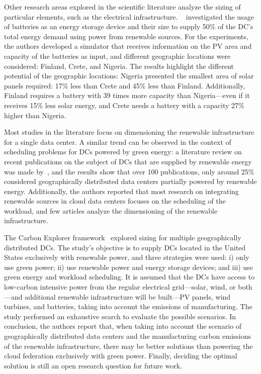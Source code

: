 Other research areas explored in the scientific literature analyze the sizing of particular elements, such as the electrical infrastructure. ~\citet{sheme2018_batsize} investigated the usage of batteries as an energy storage device and their size to supply 50\% of the DC's total energy demand using power from renewable sources. For the experiments, the authors developed a simulator that receives information on the PV area and capacity of the batteries as input, and different geographic locations were considered: Finland, Crete, and Nigeria. The results highlight the different potential of the geographic locations: Nigeria presented the smallest area of solar panels required: 17\% less than Crete and 45\% less than Finland. Additionally, Finland requires a battery with 39 times more capacity than Nigeria---even if it receives 15\% less solar energy, and Crete needs a battery with a capacity 27\% higher than Nigeria.

Most studies in the literature focus on dimensioning the renewable infrastructure for a single data center. A similar trend can be observed in the context of scheduling problems for DCs powered by green energy:  a literature review on recent publications on the subject of DCs that are supplied by renewable energy was made by~\citet{SONG2022326}, and the results show that over 100 publications, only around 25\% considered geographically distributed data centers partially powered by renewable energy. Additionally, the authors reported that most research on integrating renewable sources in cloud data centers focuses on the scheduling of the workload, and few articles analyze the dimensioning of the renewable infrastructure.

The Carbon Explorer framework~\cite{acun2022holistic} explored sizing for multiple geographically distributed DCs. The study's objective is to supply DCs located in the United States exclusively with renewable power, and three strategies were used: i) only use green power; ii) use renewable power and energy storage devices; and iii) use green energy and workload scheduling. It is assumed that the DCs have access to low-carbon intensive power from the regular electrical grid---solar, wind, or both---and additional renewable infrastructure will be built---PV panels, wind turbines, and batteries, taking into account the emissions of manufacturing. The study performed an exhaustive search to evaluate the possible scenarios. In conclusion, the authors report that, when taking into account the scenario of geographically distributed data centers and the manufacturing carbon emissions of the renewable infrastructure, there may be better solutions than powering the cloud federation exclusively with green power. Finally, deciding the optimal solution is still an open research question for future work.


